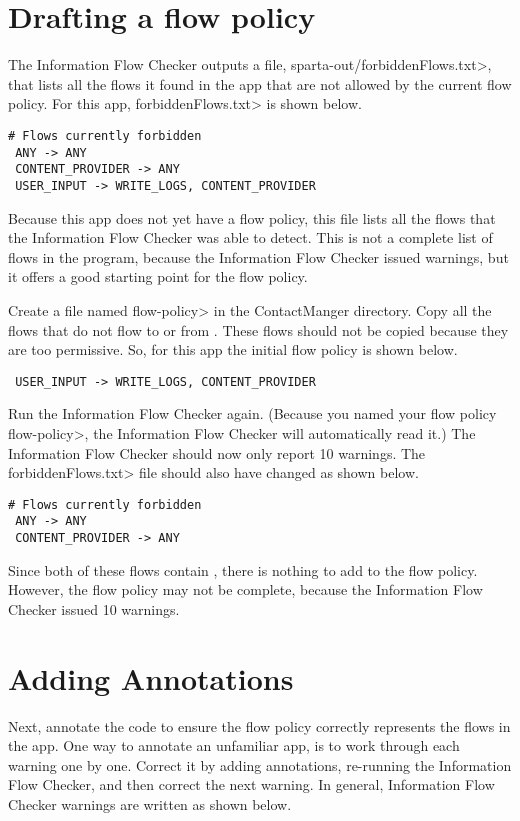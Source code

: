 \section{Drafting a flow policy}

The Information Flow Checker outputs a file, \<sparta-out/forbiddenFlows.txt>, that lists all the flows
 it found in the app that are not allowed by the current flow policy.  For this app, 
 \<forbiddenFlows.txt> is shown below. 

\begin{Verbatim} 
# Flows currently forbidden
 ANY -> ANY
 CONTENT_PROVIDER -> ANY
 USER_INPUT -> WRITE_LOGS, CONTENT_PROVIDER
\end{Verbatim} 
Because this app does not yet have a flow policy, this file lists all the flows that the 
Information Flow Checker was able to detect.  This is not a complete list of flows in the program,
because the Information Flow Checker issued warnings, but it offers a good starting point 
for the flow policy. 

Create a file named \<flow-policy> in the ContactManger directory.  Copy all the flows that   
do not flow to or from .  These flows should not be copied because 
they are too permissive.  So, for this app the initial flow policy is shown below.
\begin{Verbatim} 
 USER_INPUT -> WRITE_LOGS, CONTENT_PROVIDER
\end{Verbatim}

 Run the Information Flow Checker again.  (Because you named your flow policy 
\<flow-policy>, the Information Flow Checker will automatically read it.)  The Information Flow Checker should
now only report 10 warnings.  The \<forbiddenFlows.txt> file should also have changed as shown
below.

\begin{Verbatim}
# Flows currently forbidden
 ANY -> ANY
 CONTENT_PROVIDER -> ANY
\end{Verbatim}
 
 Since both of these flows contain , there is nothing to add 
 to the flow policy.  However, the flow policy may not be complete, because the Information Flow Checker
 issued 10 warnings.  



\section{Adding Annotations}

Next, annotate the code to ensure the flow policy correctly represents the flows
in the app.  One way to annotate an unfamiliar app, is to work through each warning
one by one. Correct it by adding annotations, re-running the Information Flow Checker, 
and then correct the next warning.  In general, 
Information Flow Checker warnings are written as shown below.


